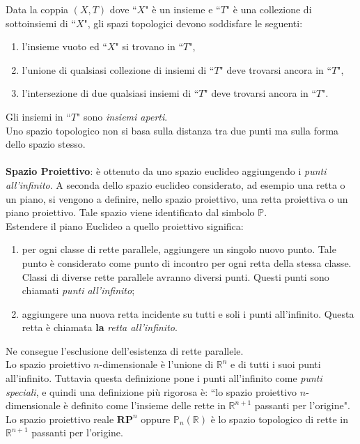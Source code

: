 \documentclass[a4paper,12pt]{tesiinfo}
\begin{document}
%
%
%
Data la coppia $(X, T)$ dove ``$X$" \`e un insieme e ``$T$" \`e una collezione di sottoinsiemi di ``$X$", gli spazi topologici devono soddisfare le seguenti:
\begin{enumerate}
 \item l'insieme vuoto ed ``$X$" si trovano in ``$T$",
 \item l'unione di qualsiasi collezione di insiemi di ``$T$" deve trovarsi ancora in ``$T$",
 \item l'intersezione di due qualsiasi insiemi di ``$T$" deve trovarsi ancora in ``$T$".
\end{enumerate}
Gli insiemi in ``$T$" sono \textit{insiemi aperti}.
\\
Uno spazio topologico non si basa sulla distanza tra due punti ma sulla forma dello spazio stesso.
\\
\\
%
%
%
\textbf{Spazio Proiettivo}: \`e ottenuto da uno spazio euclideo aggiungendo i \textit{punti all'infinito}. A seconda dello spazio euclideo considerato, ad esempio una retta o un piano, si vengono a definire, nello spazio proiettivo, una retta proiettiva o un piano proiettivo. Tale spazio viene identificato dal simbolo $\mathbb{P}$.
\\
Estendere il piano Euclideo a quello proiettivo significa:
\begin{enumerate}
 \item per ogni classe di rette parallele, aggiungere un singolo nuovo punto. Tale punto \`e considerato come punto di incontro per ogni retta della stessa classe. Classi di diverse rette parallele avranno diversi punti. Questi punti sono chiamati \textit{punti all'infinito};
 \item aggiungere una nuova retta incidente su tutti e soli i punti all'infinito. Questa retta \`e chiamata \textbf{la} \textit{retta all'infinito}.
\end{enumerate}
Ne consegue l'esclusione dell'esistenza di rette parallele.
\\
Lo spazio proiettivo $n$-dimensionale \`e l'unione di $\mathbb{R}^n$ e di tutti i suoi punti all'infinito. Tuttavia questa definizione pone i punti all'infinito come \textit{punti speciali}, e quindi una definizione pi\`u rigorosa \`e: ``lo spazio proiettivo $n$-dimensionale \`e definito come l'insieme delle rette in $\mathbb{R}^ {n+1}$ passanti per l'origine".
\\
Lo spazio proiettivo reale $\textbf{RP}^n$ oppure $\mathbb{P}_n(\mathbb{R})$ \`e lo spazio topologico di rette in $\mathbb{R}^ {n+1}$ passanti per l'origine.
\end{document}
